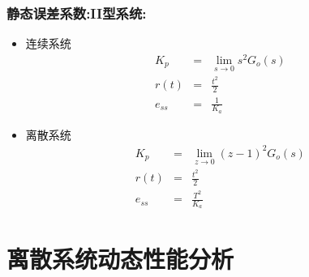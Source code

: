 \documentclass[table]{article}
\begin{document}
\begin{frame}
\frametitle{静态误差系数:II型系统:}
\label{sec-6-2-4}
\begin{itemize}

\item 连续系统
\label{sec-6-2-4-1}%
\begin{eqnarray*}
K_p &=& \lim_{s\rightarrow 0}s^2G_o(s)  \\
r(t)&=& \frac{t^2}{2} \\
e_{ss} &=& \frac{1}{K_a} 
\end{eqnarray*}

\item 离散系统
\label{sec-6-2-4-2}%
\begin{eqnarray*}
K_p &=& \lim_{z\rightarrow 0}(z-1)^2G_o(s)  \\
r(t)&=& \frac{t^2}{2} \\
e_{ss} &=& \frac{T^2}{K_a} 
\end{eqnarray*}

\end{itemize} %
\end{frame}
\section{离散系统动态性能分析}
\label{sec-7}







\end{document}
